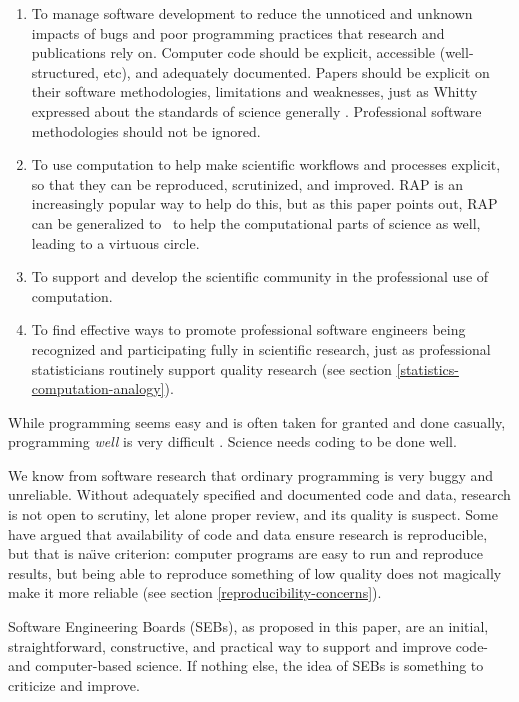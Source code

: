 \documentclass{comjnl}
\begin{document}
\begin{enumerate}\raggedright
\item 
To manage software development to reduce the unnoticed and unknown impacts of bugs and poor programming practices that research and publications rely on. Computer code should be explicit, accessible (well-structured, etc), and adequately documented. Papers should be explicit on their software methodologies, limitations and weaknesses, just as Whitty expressed about the standards of science generally \cite{whitty}. Professional software methodologies should not be ignored.

\item 
To use computation to help make scientific workflows and processes explicit, so that they can be reproduced, scrutinized, and improved. RAP is an increasingly popular way to help do this, but as this paper points out, RAP can be generalized to \RAPstar\ to help the computational parts of science as well, leading to a virtuous circle.

\item
To support and develop the scientific community in the professional use of computation.

\item
To find effective ways to promote professional software engineers being recognized and participating fully in scientific research, just as professional statisticians routinely support quality research (see section \ref{statistics-computation-analogy}).
\end{enumerate}

While programming seems easy and is often taken for granted and done casually, programming \emph{well\/} is very difficult \cite{fixit}. Science needs coding to be done well. 

We know from software research that ordinary programming is very buggy and unreliable. Without adequately specified and documented code and data, research is not open to scrutiny, let alone proper review, and its quality is suspect. Some have argued that availability of code and data ensure research is reproducible, but that is na\"\i ve criterion: computer programs are easy to run and reproduce results, but being able to reproduce something of low quality does not magically make it more reliable \cite{reproducibility,relit,popper-conjectures-refutations} (see section \ref{reproducibility-concerns}). 

Software Engineering Boards (SEBs), as proposed in this paper, are an initial, straightforward, constructive, and practical way to support and improve code- and computer-based science. If nothing else, the idea of SEBs is something to criticize and improve.
\end{document}
